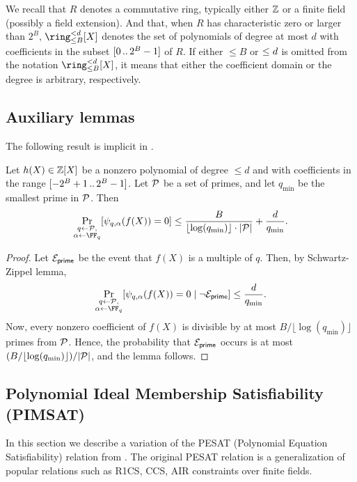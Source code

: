 \documentclass[11pt,letterpaper,usenames,dvipsnames]{article}
\begin{document}
We recall that $R$ denotes a commutative ring, typically either $\mathbb{Z}$ or a finite field (possibly a field extension). And that, when $R$ has characteristic zero or larger than $2^{B}$, $\ringtwobounds{B}{\moduledegree}[X]$ denotes the set of polynomials of degree at most $d$ with coefficients in the subset $[0 \, .. \, 2^{B}-1]$ of $R$. If either $\leq B$ or $\leq d$ is omitted from the notation $\ringtwobounds{B}{\moduledegree}[X]$, it means that either the coefficient domain  or the  degree is arbitrary, respectively.

\subsection{Auxiliary lemmas}
The following result is implicit in \cite{zincplus} . 
\begin{lemma}\label{l:reduction_lemma}
Let $h(X)\in \mathbb{Z}[X]$ be a nonzero polynomial of degree $\leq d$ and with coefficients in the range $[-2^{B}+1 \, .. \, 2^B-1]$. Let $\mathcal{P}$ be a set of primes, and let $q_{\min}$ be the smallest prime in $\mathcal{P}$. Then 
%
$$
\Pr_{\substack{q\gets \cP,\\\alpha \gets \FF_q}}[\psi_{q,\alpha}(f(X))=0] \leq \frac{B}{\lfloor\log(q_{\min})\rfloor\cdot |\cP|} + \frac{d}{q_{\min}}.
$$
\end{lemma}
\begin{proof}
Let $\mathcal{E}_{\mathsf{prime}}$ be the event that $f(X)$ is  a multiple of $q$. Then, by Schwartz-Zippel lemma, $$\Pr_{\substack{q\gets \cP,\\\alpha \gets \FF_q}}[\psi_{q,\alpha}(f(X))=0\mid \neg \cE_{\mathsf{prime}}] \leq  \frac{d}{q_{\min}}.$$
%
Now, every nonzero coefficient of $f(X)$ is divisible by at most $B/\lfloor\log(q_{\min})\rfloor$ primes from $\mathcal{P}$. Hence, the probability that $\mathcal{E}_{\mathsf{prime}}$ occurs is at most $(B/\lfloor\log(q_{\min})\rfloor)/|\mathcal{P}|$, and the lemma follows.
%
\end{proof}







\subsection{Polynomial Ideal Membership Satisfiability (PIMSAT)}

In this section we describe a variation of the PESAT  (Polynomial Equation Satisfiability) relation from \cite{?}. The original PESAT relation is a generalization of popular relations such as R1CS, CCS, AIR constraints over finite fields. 
\end{document}
